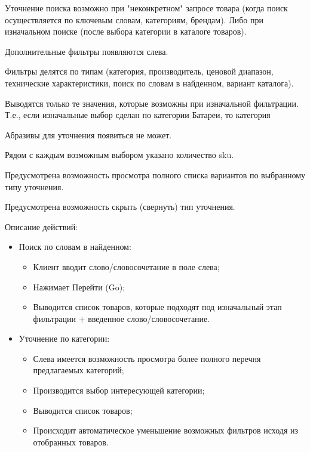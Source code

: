 {


\begin{wikilong}
	Уточнение поиска возможно при "неконкретном" запросе товара (когда поиск осуществляется по ключевым словам, категориям, брендам). Либо при изначальном поиске (после выбора категории в каталоге товаров).
	
	Дополнительные фильтры появляются слева.
	
	Фильтры делятся по типам (категория, производитель, ценовой диапазон, технические характеристики, поиск по словам в найденном, вариант каталога).
	
	Выводятся только те значения, которые возможны при изначальной фильтрации. Т.е., если изначальные выбор сделан по категории Батареи, то категория 
	
	Абразивы для уточнения появиться не может.
	
	Рядом с каждым возможным выбором указано количество sku.
	
	Предусмотрена возможность просмотра полного списка вариантов по выбранному типу уточнения.
	
	Предусмотрена возможность скрыть (свернуть) тип уточнения.
	
	Описание действий:
	\begin{itemize}
		\item Поиск по словам в найденном:
			\begin{itemize}
				\item Клиент вводит слово/словосочетание в поле слева;
				\item Нажимает Перейти (Go);
				\item Выводится список товаров, которые подходят под изначальный этап фильтрации + введенное слово/словосочетание.
			\end{itemize}
		
		\item Уточнение по категории:
			\begin{itemize}
				\item Слева имеется возможность просмотра более полного перечня предлагаемых категорий;
				\item Производится выбор интересующей категории;
				\item Выводится список товаров;
				\item Происходит автоматическое уменьшение возможных фильтров исходя из отобранных товаров.
			\end{itemize}
		

\end{itemize}
\end{wikilong}}
